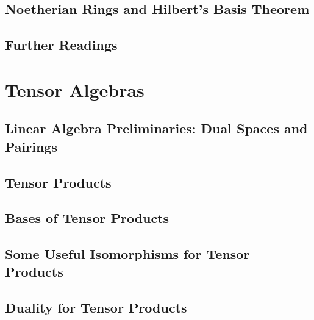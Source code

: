 \documentclass[a4paper]{article}
\begin{document}
\subsection{ Noetherian Rings and Hilbert's Basis Theorem} %

\subsection{ Further Readings} %


\newpage
\section{Tensor Algebras}
\subsection{ Linear Algebra Preliminaries: Dual Spaces and Pairings} %

\subsection{ Tensor Products} %

\subsection{ Bases of Tensor Products} %

\subsection{ Some Useful Isomorphisms for Tensor Products} %

\subsection{ Duality for Tensor Products} %
\end{document}
